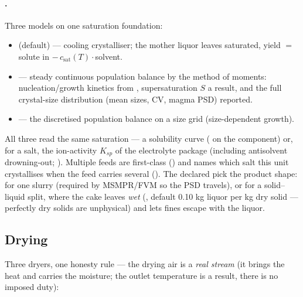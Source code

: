 \documentclass[11pt,a4paper]{article}
\begin{document}
\paragraph{.}  Three models on one saturation
foundation:

\begin{itemize}[leftmargin=*,nosep,topsep=2pt]
\item {} (default) --- cooling crystalliser; the mother
      liquor leaves saturated, yield $=$ solute in $-\,c_{\mathrm{sat}}(T)\cdot$solvent.
\item {} --- steady continuous population balance by the
      method of moments: nucleation/growth kinetics from
      , supersaturation $S$ a result,
      and the full crystal-size distribution (mean sizes, CV, magma
      PSD) reported.
\item {} --- the discretised population balance on a size grid
      (size-dependent growth).
\end{itemize}

All three read the same saturation --- a solubility curve
( on the component) or, for a salt, the
ion-activity $K_{sp}$ of the electrolyte package (including antisolvent
drowning-out; ).
Multiple feeds are first-class ()
and  names which salt this unit
crystallises when the feed carries several
().  The declared
 pick the product shape:  for one slurry
(required by MSMPR/FVM so the PSD travels), or
 for a solid--liquid split, where the
cake leaves \emph{wet} (, default 0.10 kg liquor per
kg dry solid --- perfectly dry solids are unphysical) and
 lets fines escape with the liquor.

\subsection{Drying}\label{sec:drying}

Three dryers, one honesty rule --- the drying air is a \emph{real
stream} (it brings the heat and carries the moisture; the outlet
temperature is a result, there is no imposed duty):
\end{document}
